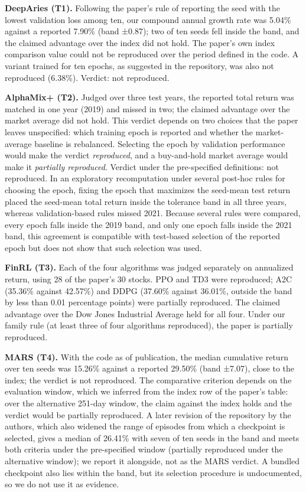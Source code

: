 \documentclass[12pt,a4paper]{report}
\begin{document}
\textbf{DeepAries (T1).} Following the paper's rule of reporting the
seed with the lowest validation loss among ten, our compound annual
growth rate was 5.04\% against a reported 7.90\% (band ±0.87); two of
ten seeds fell inside the band, and the claimed advantage over the index
did not hold. The paper's own index comparison value could not be
reproduced over the period defined in the code. A variant trained for
ten epochs, as suggested in the repository, was also not reproduced
(6.38\%). Verdict: not reproduced.

\textbf{AlphaMix+ (T2).} Judged over three test years, the reported
total return was matched in one year (2019) and missed in two; the
claimed advantage over the market average did not hold. This verdict
depends on two choices that the paper leaves unspecified: which training
epoch is reported and whether the market-average baseline is rebalanced.
Selecting the epoch by validation performance would make the verdict
\emph{reproduced}, and a buy-and-hold market average would make it
\emph{partially reproduced}. Verdict under the pre-specified
definitions: not reproduced. In an exploratory recomputation under
several post-hoc rules for choosing the epoch, fixing the epoch that
maximizes the seed-mean test return placed the seed-mean total return
inside the tolerance band in all three years, whereas validation-based
rules missed 2021. Because several rules were compared, every epoch
falls inside the 2019 band, and only one epoch falls inside the 2021
band, this agreement is compatible with test-based selection of the
reported epoch but does not show that such selection was used.

\textbf{FinRL (T3).} Each of the four algorithms was judged separately
on annualized return, using 28 of the paper's 30 stocks. PPO and TD3
were reproduced; A2C (35.36\% against 42.57\%) and DDPG (37.60\% against
36.01\%, outside the band by less than 0.01 percentage points) were
partially reproduced. The claimed advantage over the Dow Jones
Industrial Average held for all four. Under our family rule (at least
three of four algorithms reproduced), the paper is partially reproduced.

\textbf{MARS (T4).} With the code as of publication, the median
cumulative return over ten seeds was 15.26\% against a reported 29.50\%
(band ±7.07), close to the index; the verdict is not reproduced. The
comparative criterion depends on the evaluation window, which we
inferred from the index row of the paper's table: over the alternative
251-day window, the claim against the index holds and the verdict would
be partially reproduced. A later revision of the repository by the
authors, which also widened the range of episodes from which a
checkpoint is selected, gives a median of 26.41\% with seven of ten
seeds in the band and meets both criteria under the pre-specified window
(partially reproduced under the alternative window); we report it
alongside, not as the MARS verdict. A bundled checkpoint also lies
within the band, but its selection procedure is undocumented, so we do
not use it as evidence.
\end{document}
